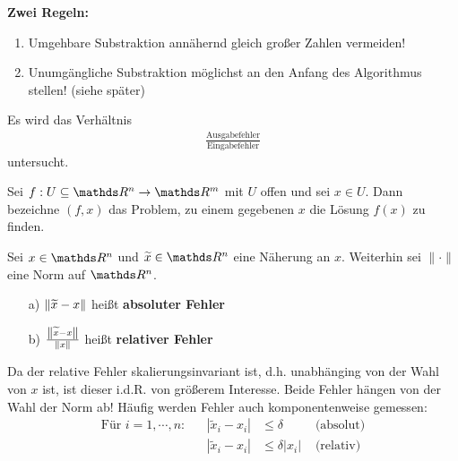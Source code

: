 \textbf{Zwei Regeln:}
\begin{enumerate}[1)]
\item Umgehbare Substraktion annähernd gleich großer Zahlen vermeiden!
\item Unumgängliche Substraktion möglichst an den Anfang des Algorithmus stellen! (siehe später)
\end{enumerate}

 \label{3.2}
Es wird das Verhältnis 
\begin{gather*}
  \frac{\text{Ausgabefehler}}{\text{Eingabefehler}}
\end{gather*}
untersucht.

\begin{Defe}
  \label{3.2.1} 
  Sei $f: U \subseteq \R^n \rightarrow \R^m$ mit $U$ offen und sei $x\in U$.
  Dann bezeichne $(f, x)$ das Problem, zu einem gegebenen $x$ die Lösung $f(x)$ zu finden.
\end{Defe}

\begin{Defe}
  \label{3.2.2} 
  Sei $x\in\R^n$ und $\widetilde{x} \in \R^n$ eine Näherung an $x$. Weiterhin sei $\|\cdot\|$ eine Norm auf $\R^n$.
  \begin{itemize}
  \item[a)] $\left\| \widetilde{x} - x \right\|$ heißt \textbf{absoluter Fehler} 
  \item[b)] $\frac{\left\| \widetilde{x} - x \right\|}{\left\| x \right\|}$ heißt \textbf{relativer Fehler}
  \end{itemize}
  Da der relative Fehler skalierungsinvariant ist, d.h. unabhänging von der  Wahl von $x$ ist, ist dieser i.d.R. von größerem Interesse.
  Beide Fehler hängen von der Wahl der Norm ab!
  Häufig werden Fehler auch komponentenweise gemessen:
  \begin{align*}
    \text{Für } i=1,\cdots , n : && |\widetilde{x}_i - x_i | & \leq \delta & \text{ (absolut)} \\
                                 && |\widetilde{x}_i - x_i | &\leq \delta |x_i| & \text{ (relativ)}
  \end{align*}
\end{Defe}


